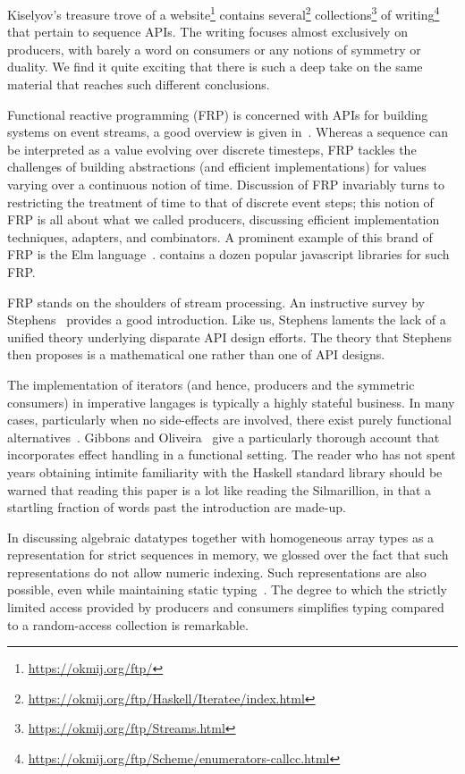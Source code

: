 \documentclass[sigplan,screen,10pt,review]{acmart}
\begin{document}
Kiselyov's treasure trove of a website\footnote{\url{https://okmij.org/ftp/}} contains several\footnote{\url{https://okmij.org/ftp/Haskell/Iteratee/index.html}} collections\footnote{\url{https://okmij.org/ftp/Streams.html}} of writing\footnote{\url{https://okmij.org/ftp/Scheme/enumerators-callcc.html}} that pertain to sequence APIs. The writing focuses almost exclusively on producers, with barely a word on consumers or any notions of symmetry or duality. We find it quite exciting that there is such a deep take on the same material that reaches such different conclusions.

Functional reactive programming (FRP) is concerned with APIs for building systems on event streams, a good overview is given in~\cite{perez2016functional}. Whereas a sequence can be interpreted as a value evolving over discrete timesteps, FRP tackles the challenges of building abstractions (and efficient implementations) for values varying over a continuous notion of time. Discussion of FRP invariably turns to restricting the treatment of time to that of discrete event steps; this notion of FRP is all about what we called producers, discussing efficient implementation techniques, adapters, and combinators. A prominent example of this brand of FRP is the Elm language~\cite{czaplicki2013asynchronous}.  contains a dozen popular javascript libraries for such FRP.

FRP stands on the shoulders of stream processing. An instructive survey by Stephens~\cite{stephens1997survey} provides a good introduction. Like us, Stephens laments the lack of a unified theory underlying disparate API design efforts. The theory that Stephens then proposes is a mathematical one rather than one of API designs.

The implementation of iterators (and hence, producers and the symmetric consumers) in imperative langages is typically a highly stateful business. In many cases, particularly when no side-effects are involved, there exist purely functional alternatives~\cite{baker1993iterators}. Gibbons and Oliveira~\cite{gibbons2009essence} give a particularly thorough account that incorporates effect handling in a functional setting. The reader who has not spent years obtaining intimite familiarity with the Haskell standard library should be warned that reading this paper is a lot like reading the Silmarillion, in that a startling fraction of words past the introduction are made-up.

In discussing algebraic datatypes together with homogeneous array types as a representation for strict sequences in memory, we glossed over the fact that such representations do not allow numeric indexing. Such representations are also possible, even while maintaining static typing~\cite{kiselyov2004strongly}. The degree to which the strictly limited access provided by producers and consumers simplifies typing compared to a random-access collection is remarkable.
\end{document}
